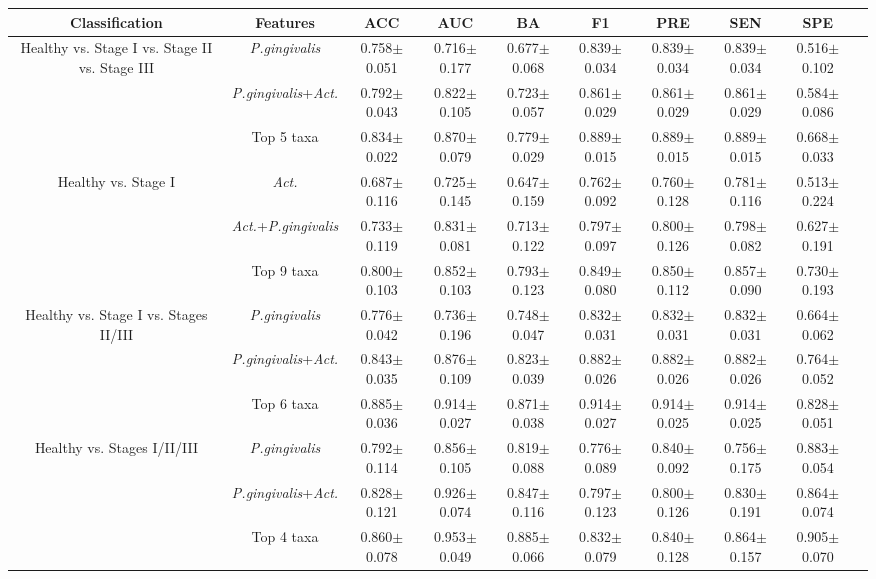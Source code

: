 \begin{tabular}{c|ccccccccc}
    \textbf{Classification} & \textbf{Features} & \textbf{ACC} & \textbf{AUC} & \textbf{BA} & \textbf{F1} & \textbf{PRE} & \textbf{SEN} & \textbf{SPE} & \\
    \hline
    Healthy vs. Stage I vs. Stage II vs. Stage III & \textit{P.gingivalis} & 0.758$\pm$0.051 & 0.716$\pm$0.177 & 0.677$\pm$0.068 & 0.839$\pm$0.034 & 0.839$\pm$0.034 & 0.839$\pm$0.034 & 0.516$\pm$0.102 &  \\
     & \textit{P.gingivalis}+\textit{Act.} & 0.792$\pm$0.043 & 0.822$\pm$0.105 & 0.723$\pm$0.057 & 0.861$\pm$0.029 & 0.861$\pm$0.029 & 0.861$\pm$0.029 & 0.584$\pm$0.086 &  \\
     & Top 5 taxa & 0.834$\pm$0.022 & 0.870$\pm$0.079 & 0.779$\pm$0.029 & 0.889$\pm$0.015 & 0.889$\pm$0.015 & 0.889$\pm$0.015 & 0.668$\pm$0.033 &  \\
    Healthy vs. Stage I & \textit{Act.} & 0.687$\pm$0.116 & 0.725$\pm$0.145 & 0.647$\pm$0.159 & 0.762$\pm$0.092 & 0.760$\pm$0.128 & 0.781$\pm$0.116 & 0.513$\pm$0.224 &  \\
     & \textit{Act.}+\textit{P.gingivalis} & 0.733$\pm$0.119 & 0.831$\pm$0.081 & 0.713$\pm$0.122 & 0.797$\pm$0.097 & 0.800$\pm$0.126 & 0.798$\pm$0.082 & 0.627$\pm$0.191 &  \\
     & Top 9 taxa & 0.800$\pm$0.103 & 0.852$\pm$0.103 & 0.793$\pm$0.123 & 0.849$\pm$0.080 & 0.850$\pm$0.112 & 0.857$\pm$0.090 & 0.730$\pm$0.193 &  \\
    Healthy vs. Stage I vs. Stages II/III & \textit{P.gingivalis} & 0.776$\pm$0.042 & 0.736$\pm$0.196 & 0.748$\pm$0.047 & 0.832$\pm$0.031 & 0.832$\pm$0.031 & 0.832$\pm$0.031 & 0.664$\pm$0.062 &  \\
     & \textit{P.gingivalis}+\textit{Act.} & 0.843$\pm$0.035 & 0.876$\pm$0.109 & 0.823$\pm$0.039 & 0.882$\pm$0.026 & 0.882$\pm$0.026 & 0.882$\pm$0.026 & 0.764$\pm$0.052 &  \\
     & Top 6 taxa & 0.885$\pm$0.036 & 0.914$\pm$0.027 & 0.871$\pm$0.038 & 0.914$\pm$0.027 & 0.914$\pm$0.025 & 0.914$\pm$0.025 & 0.828$\pm$0.051 &  \\
    Healthy vs. Stages I/II/III & \textit{P.gingivalis} & 0.792$\pm$0.114 & 0.856$\pm$0.105 & 0.819$\pm$0.088 & 0.776$\pm$0.089 & 0.840$\pm$0.092 & 0.756$\pm$0.175 & 0.883$\pm$0.054 &  \\
     & \textit{P.gingivalis}+\textit{Act.} & 0.828$\pm$0.121 & 0.926$\pm$0.074 & 0.847$\pm$0.116 & 0.797$\pm$0.123 & 0.800$\pm$0.126 & 0.830$\pm$0.191 & 0.864$\pm$0.074 &  \\
     & Top 4 taxa & 0.860$\pm$0.078 & 0.953$\pm$0.049 & 0.885$\pm$0.066 & 0.832$\pm$0.079 & 0.840$\pm$0.128 & 0.864$\pm$0.157 & 0.905$\pm$0.070 &  \\
\end{tabular}
